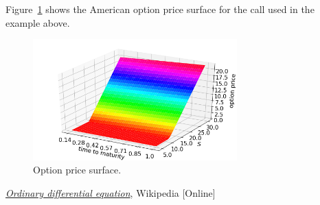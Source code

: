 Figure~\ref{fig:american_call_surface} shows the American option price surface for the call used in the example above.
\begin{figure}[htb]
	\centering
	\includegraphics[width=0.7\textwidth]{figures/american_call_surface}
	\caption{Option price surface.}
	\label{fig:american_call_surface}
\end{figure} 

%

\begin{thebibliography}{9}
\href{https://en.wikipedia.org/wiki/Ordinary_differential_equation}{\emph{Ordinary differential equation}}, Wikipedia [Online]
\end{thebibliography}


